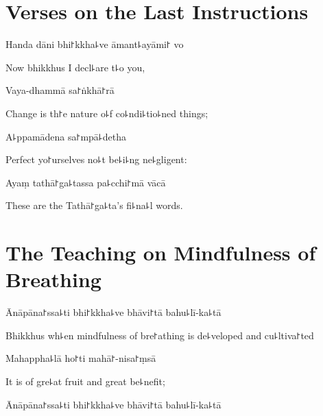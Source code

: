 \chapter{Verses on the Last Instructions}%

\begin{leader}
\end{leader}

Handa dāni bhi꜓kkha꜕ve āmant꜕ayāmi꜓ vo

\begin{english}
  Now bhikkhus I decl꜕are t꜕o you,
\end{english}

Vaya-dhammā sa꜓ṅkhā꜓rā

\begin{english}
  Change is th꜓e nature o꜕f co꜕ndi꜕tio꜕ned things;
\end{english}

A꜕ppamādena sa꜓mpā꜕detha

\begin{english}
  Perfect yo꜓urselves no꜕t be꜕i꜕ng ne꜕gligent:
\end{english}

Ayaṃ tathā꜓ga꜕tassa pa꜕cchi꜓mā vācā

\begin{english}
  These are the Tathā꜓ga꜕ta's fi꜕na꜕l words.
\end{english}

\chapter{The Teaching on Mindfulness of Breathing}%

\begin{leader}
\end{leader}

Ānāpāna꜓ssa꜕ti bhi꜓kkha꜕ve bhāvi꜓tā bahu꜕lī-ka꜕tā

\begin{english}
  Bhikkhus wh꜕en mindfulness of bre꜓athing is de꜕veloped and cu꜕ltiva꜓ted
\end{english}

Mahappha꜕lā ho꜓ti mahā꜓-nisa꜓ṃsā

\begin{english}
  It is of gre꜕at fruit and great be꜕nefit;
\end{english}

Ānāpāna꜓ssa꜕ti bhi꜓kkha꜕ve bhāvi꜓tā bahu꜕lī-ka꜕tā


